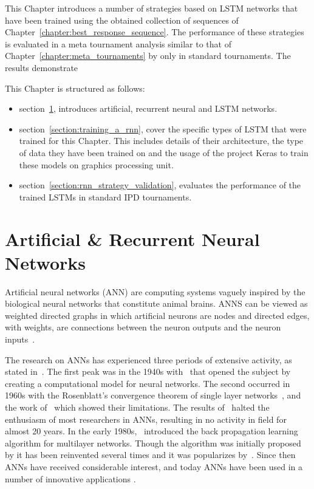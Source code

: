 This Chapter introduces a number of strategies based on LSTM networks that have
been trained using the obtained collection of sequences of
Chapter~\ref{chapter:best_response_sequence}. The performance of these strategies
is evaluated in a meta tournament analysis similar to that of
Chapter~\ref{chapter:meta_tournaments} by only in standard tournaments. The
results demonstrate %

This Chapter is structured as follows:

\begin{itemize}
    \item section~\ref{section:artificial_neural_networks}, introduces
    artificial, recurrent neural and LSTM networks.
    \item section~\ref{section:training_a_rnn}, cover the specific types of LSTM
    that were trained for this Chapter. This includes details of their
    architecture, the type of data they have been trained on and the usage of
    the project Keras to train these models on graphics processing unit.
    \item section~\ref{section:rnn_strategy_validation}, evaluates the
    performance of the trained LSTMs in \metatournamentslstm standard IPD
    tournaments.
\end{itemize}

\section{Artificial \& Recurrent Neural Networks}\label{section:artificial_neural_networks}

Artificial neural networks (ANN) are computing systems vaguely inspired by the
biological neural networks that constitute animal brains. ANNS can be viewed as
weighted directed graphs in which artificial neurons are nodes and directed
edges, with weights, are connections between the neuron outputs and the neuron
inputs~\cite{Jain1996}.

The research on ANNs has experienced three periods of extensive activity, as
stated in~\cite{Jain1996}. The first peak was in the 1940s
with~\cite{McCulloch1943} that opened the subject by creating a computational
model for neural networks. The second occurred in 1960s with the Rosenblatt's
convergence theorem of single layer networks~\cite{Rosenblatt1961}, and
the work of~\cite{Minsky1969} which showed their limitations.
The results of~\cite{Minsky1969} halted the enthusiasm of most
researchers in ANNs, resulting in no activity in field for almost 20 years. In
the early 1980s,~\cite{Werbos1974} introduced the back propagation learning
algorithm for multilayer networks. Though the algorithm was
initially proposed by it has been reinvented several times and it was
popularizes by~\cite{McClelland1986}. Since then ANNs have received considerable
interest, and today ANNs have been used in a number of innovative applications
\cite{Kalogirou2000, Covington2016}.

